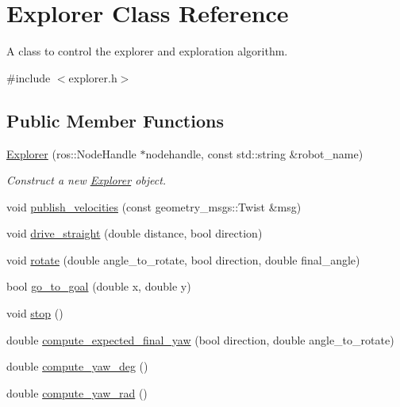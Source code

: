 \hypertarget{class_explorer}{}\section{Explorer Class Reference}
\label{class_explorer}


A class to control the explorer and exploration algorithm.  




{\ttfamily \#include $<$explorer.\+h$>$}

\subsection*{Public Member Functions}
\begin{DoxyCompactItemize}
\item 
\hyperlink{class_explorer_aafe6b7c3b9c2e24815aa14a731f31890}{Explorer} (ros\+::\+Node\+Handle $\ast$nodehandle, const std\+::string \&robot\+\_\+name)
\begin{DoxyCompactList}\small\item\em Construct a new \hyperlink{class_explorer}{Explorer} object. \end{DoxyCompactList}\item 
void \hyperlink{class_explorer_a8ffef25585ef957b9df4407366723787}{publish\+\_\+velocities} (const geometry\+\_\+msgs\+::\+Twist \&msg)
\item 
void \hyperlink{class_explorer_ab4ca9f16c48a60fc4d0e426b6fd9e9a0}{drive\+\_\+straight} (double distance, bool direction)
\item 
void \hyperlink{class_explorer_ac8e3a980fd3929734fb3a4b0b2e0a7e0}{rotate} (double angle\+\_\+to\+\_\+rotate, bool direction, double final\+\_\+angle)
\item 
bool \hyperlink{class_explorer_aa1e259feaac1114adb0f24588428e8ef}{go\+\_\+to\+\_\+goal} (double x, double y)
\item 
void \hyperlink{class_explorer_a0e4a623ff30d1886cc9f57ec081c527f}{stop} ()
\item 
double \hyperlink{class_explorer_a02c37b93448ed474f1bf0d03e2758ca2}{compute\+\_\+expected\+\_\+final\+\_\+yaw} (bool direction, double angle\+\_\+to\+\_\+rotate)
\item 
double \hyperlink{class_explorer_a670cdffdb8c3173c300590cfc45ab6d2}{compute\+\_\+yaw\+\_\+deg} ()
\item 
double \hyperlink{class_explorer_ac5b91cd64189a60ffe62535cb5bc093a}{compute\+\_\+yaw\+\_\+rad} ()
\item 

\end{DoxyCompactItemize}

